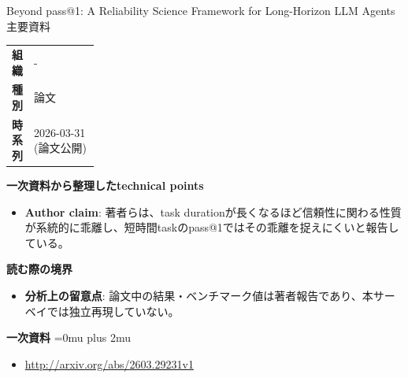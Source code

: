 \begin{technicalnote}{Beyond pass@1: A Reliability Science Framework for Long-Horizon LLM Agents}{主要資料}
\begingroup
\begin{tabularx}{\linewidth}{@{}>{\bfseries}p{0.22\linewidth}X@{}}
組織 & - \\
種別 & 論文 \\
時系列 & 2026-03-31 (論文公開) \\
\end{tabularx}
\smallskip
{\bfseries 一次資料から整理したtechnical points}
\begin{itemize}[leftmargin=1.5em,itemsep=0.35em]
\item \textbf{Author claim}: 著者らは、task durationが長くなるほど信頼性に関わる性質が系統的に乖離し、短時間taskのpass@1ではその乖離を捉えにくいと報告している。
\end{itemize}
\begin{minipage}{\linewidth}
{\bfseries 読む際の境界}
\begin{itemize}[leftmargin=1.5em,itemsep=0.35em]
\item \textbf{分析上の留意点}: 論文中の結果・ベンチマーク値は著者報告であり、本サーベイでは独立再現していない。
\end{itemize}
\begin{samepage}
{\bfseries 一次資料}
\begingroup\sloppy
\Urlmuskip=0mu plus 2mu\relax
\begin{itemize}[leftmargin=1.5em,itemsep=0.25em]
\item {\scriptsize\url{http://arxiv.org/abs/2603.29231v1}}
\end{itemize}
\endgroup
\end{samepage}
\end{minipage}
\endgroup
\end{technicalnote}
\medskip

